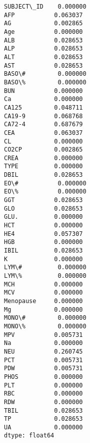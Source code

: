 \documentclass[11pt]{article}
\makeatletter
\newcommand{\boxspacing}{\kern\kvtcb@left@rule\kern\kvtcb@boxsep}
\newcommand{\prompt}[4]{
        {\ttfamily\llap{{\color{#2}[#3]:\hspace{3pt}#4}}\vspace{-\baselineskip}}
    }
\makeatother
\begin{document}
            \begin{tcolorbox}[breakable, size=fbox, boxrule=.5pt, pad at break*=1mm, opacityfill=0]
\prompt{Out}{outcolor}{12}{\boxspacing}
\begin{Verbatim}[commandchars=\\\{\}]
SUBJECT\_ID    0.000000
AFP           0.063037
AG            0.002865
Age           0.000000
ALB           0.028653
ALP           0.028653
ALT           0.028653
AST           0.028653
BASO\#         0.000000
BASO\%         0.000000
BUN           0.000000
Ca            0.000000
CA125         0.048711
CA19-9        0.068768
CA72-4        0.687679
CEA           0.063037
CL            0.000000
CO2CP         0.002865
CREA          0.000000
TYPE          0.000000
DBIL          0.028653
EO\#           0.000000
EO\%           0.000000
GGT           0.028653
GLO           0.028653
GLU.          0.000000
HCT           0.000000
HE4           0.057307
HGB           0.000000
IBIL          0.028653
K             0.000000
LYM\#          0.000000
LYM\%          0.000000
MCH           0.000000
MCV           0.000000
Menopause     0.000000
Mg            0.000000
MONO\#         0.000000
MONO\%         0.000000
MPV           0.005731
Na            0.000000
NEU           0.260745
PCT           0.005731
PDW           0.005731
PHOS          0.000000
PLT           0.000000
RBC           0.000000
RDW           0.000000
TBIL          0.028653
TP            0.028653
UA            0.000000
dtype: float64
\end{Verbatim}
\end{tcolorbox}
        
\end{document}
